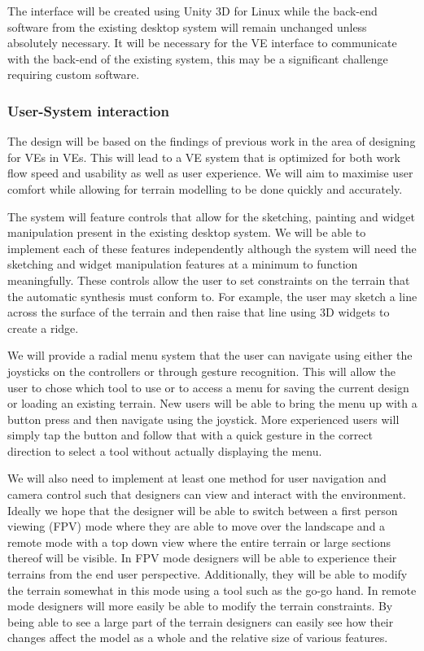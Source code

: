 \documentclass{sig-alternate-05-2015}
\begin{document}
The interface will be created using Unity 3D for Linux while the back-end software from the existing desktop system will remain unchanged unless absolutely necessary. It will be necessary for the VE interface to communicate with the back-end of the existing system, this may be a significant challenge requiring custom software.

\subsubsection{User-System interaction}
The design will be based on the findings of previous work in the area of designing for VEs in VEs. This will lead to a VE system that is optimized for both work flow speed and usability as well as user experience. We will aim to maximise user comfort while allowing for terrain modelling to be done quickly and accurately.

The system will feature controls that allow for the sketching, painting and widget manipulation present in the existing desktop system. We will be able to implement each of these features independently although the system will need the sketching and widget manipulation features at a minimum to function meaningfully. These controls allow the user to set constraints on the terrain that the automatic synthesis must conform to. For example, the user may sketch a line across the surface of the terrain and then raise that line using 3D widgets to create a ridge. 

We will provide a radial menu system that the user can navigate using either the joysticks on the controllers or through gesture recognition. This will allow the user to chose which tool to use or to access a menu for saving the current design or loading an existing terrain. New users will be able to bring the menu up with a button press and then navigate using the joystick. More experienced users will simply tap the button and follow that with a quick gesture in the correct direction to select a tool without actually displaying the menu.

We will also need to implement at least one method for user navigation and camera control such that designers can view and interact with the environment. Ideally we hope that the designer will be able to switch between a first person viewing (FPV) mode where they are able to move over the landscape and a remote mode with a top down view where the entire terrain or large sections thereof will be visible. In FPV mode designers will be able to experience their terrains from the end user perspective. Additionally, they will be able to modify the terrain somewhat in this mode using a tool such as the go-go hand. In remote mode designers will more easily be able to modify the terrain constraints. By being able to see a large part of the terrain designers can easily see how their changes affect the model as a whole and the relative size of various features.
\end{document}
